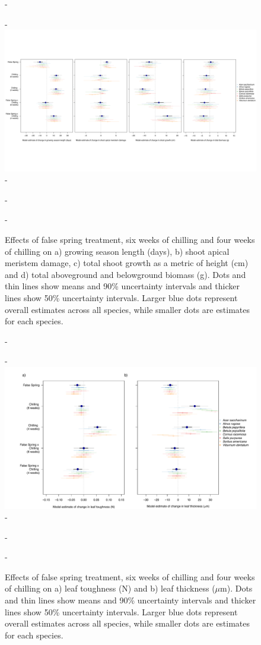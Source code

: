 \documentclass{article}\usepackage[]{graphicx}\usepackage[]{color}
\begin{document}
  {\begin{figure} [H]
  -\begin{center}
  -\includegraphics[width=18cm, trim={0, 4cm, 0, 3.5cm}, clip]{..//analyses/figures/mu_gs_damage_growth.pdf} 
  -\caption{Effects of false spring treatment, six weeks of chilling and four weeks of chilling on a) growing season length (days), b) shoot apical meristem damage, c) total shoot growth as a metric of height (cm) and d) total aboveground and belowground biomass (g). Dots and thin lines show means and 90\% uncertainty intervals and thicker lines show 50\% uncertainty intervals. Larger blue dots represent overall estimates across all species, while smaller dots are estimates for each species. }\label{fig:mugrowth} 
  -\end{center}
  -\end{figure}}
  
  {\begin{figure} [H]
  -\begin{center}
  -\includegraphics[width=18cm]{..//analyses/figures/mu_leaftraits.pdf} 
  -\caption{Effects of false spring treatment, six weeks of chilling and four weeks of chilling on a) leaf toughness (N) and b) leaf thickness ($\mu$m). Dots and thin lines show means and 90\% uncertainty intervals and thicker lines show 50\% uncertainty intervals. Larger blue dots represent overall estimates across all species, while smaller dots are estimates for each species. }\label{fig:muleaf}
  -\end{center}
  -\end{figure}}
  
\end{document}
